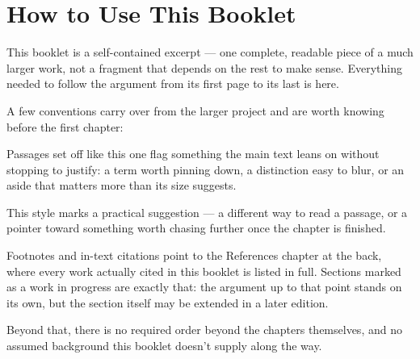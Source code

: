 \chapter*{How to Use This Booklet}

This booklet is a self-contained excerpt --- one complete, readable
piece of a much larger work, not a fragment that depends on the rest
to make sense. Everything needed to follow the argument from its first
page to its last is here.

A few conventions carry over from the larger project and are worth
knowing before the first chapter:

\begin{notebox}
Passages set off like this one flag something the main text leans on
without stopping to justify: a term worth pinning down, a distinction
easy to blur, or an aside that matters more than its size suggests.
\end{notebox}

\begin{tipbox}
This style marks a practical suggestion --- a different way to read a
passage, or a pointer toward something worth chasing further once the
chapter is finished.
\end{tipbox}

Footnotes and in-text citations point to the References chapter at the
back, where every work actually cited in this booklet is listed in
full. Sections marked as a work in progress are exactly that: the
argument up to that point stands on its own, but the section itself
may be extended in a later edition.

Beyond that, there is no required order beyond the chapters
themselves, and no assumed background this booklet doesn't supply
along the way.
